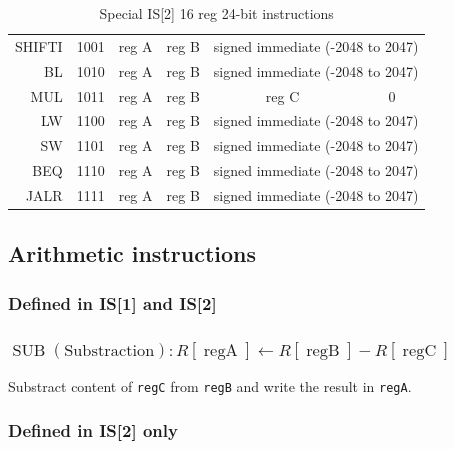 \documentclass[10pt,a4paper]{article}
\theoremstyle{definition}%
\newcommand{\on}[1]{\operatorname{#1}}
\newcommand{\reg}[1]{\texttt{reg#1}}
\begin{document}
\begin{table}[ht!]
\begin{center}
\begin{tabular}{r|c|c|c|c|c}
		SHIFTI & 1001 & reg A & reg B & \multicolumn{2}{c}{signed immediate (-2048 to 2047)} \\
		BL & 1010 & reg A & reg B & \multicolumn{2}{c}{signed immediate (-2048 to 2047)} \\
		MUL & 1011 & reg A & reg B & reg C & 0 \\
		LW& 1100 & reg A & reg B & \multicolumn{2}{c}{signed immediate (-2048 to 2047)} \\
		SW& 1101 & reg A & reg B & \multicolumn{2}{c}{signed immediate (-2048 to 2047)} \\
		BEQ & 1110 & reg A & reg B & \multicolumn{2}{c}{signed immediate (-2048 to 2047)} \\
		JALR & 1111 & reg A & reg B & \multicolumn{2}{c}{signed immediate (-2048 to 2047)} \\
		\bottomrule
		\end{tabular}
	\end{center}
\caption{Special IS[2] 16 reg 24-bit instructions}
\label{tab:IS1-16-24}
\end{table}

\clearpage
\subsection{Arithmetic instructions}
\subsubsection*{ Defined in IS[1] and IS[2]}
\subsubsection{$\on{SUB} \on{(Substraction)}: R\left[ \on{regA} \right] \longleftarrow  R\left[ \on{regB} \right] -  R\left[ \on{regC} \right]$}
Substract content of \reg{C} from \reg{B} and write the result in \reg{A}.

\subsubsection*{ Defined in IS[2] only}
\end{document}
